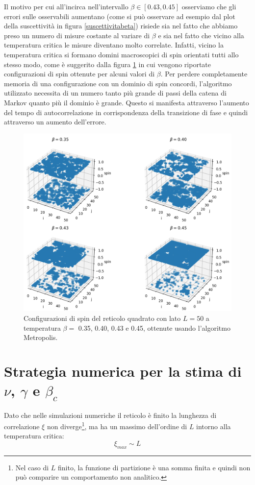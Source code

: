\documentclass[10pt,a4paper]{article}
\begin{document}
Il motivo per cui all'incirca nell'intervallo $\beta\in[0.43,0.45]$ osserviamo che gli errori sulle osservabili aumentano (come si può osservare ad esempio dal plot della suscettività in figura \ref{suscettivitabeta}) risiede sia nel fatto che abbiamo preso un numero di misure costante al variare di $\beta$ e sia nel fatto che vicino alla temperatura critica le misure diventano molto correlate. Infatti, vicino la temperatura critica si formano domini macroscopici di spin orientati tutti allo stesso modo, come è suggerito dalla figura \ref{reticoli} in cui vengono riportate configurazioni di spin ottenute per alcuni valori di $\beta$. Per perdere completamente memoria di una configurazione con un dominio di spin concordi, l'algoritmo utilizzato necessita di un numero tanto più grande di passi della catena di Markov quanto più il dominio è grande. Questo si manifesta attraverso l'aumento del tempo di autocorrelazione in corrispondenza della transizione di fase e quindi attraverso un aumento dell'errore. 
\begin{figure}[h!]%
	\centering
	\includegraphics[width=0.7\linewidth]{reticoli}
	\caption{Configurazioni di spin del reticolo quadrato con lato $L=50$ a temperatura $\beta=$ 0.35, 0.40, 0.43 e 0.45, ottenute usando l'algoritmo Metropolis. }
	\label{reticoli}
\end{figure}



\section{Strategia numerica per la stima di $\nu$, $\gamma$ e $\beta_c$} 
Dato che nelle simulazioni numeriche il reticolo è finito la lunghezza di correlazione $\xi$ non diverge\footnote{Nel caso di $L$ finito, la funzione di partizione è una somma finita e quindi non può comparire un comportamento non analitico.}, ma ha un massimo dell'ordine di $L$ intorno alla temperatura critica:
\begin{equation}\label{ximax}
\xi_{max}\sim L
\end{equation}
\end{document}
